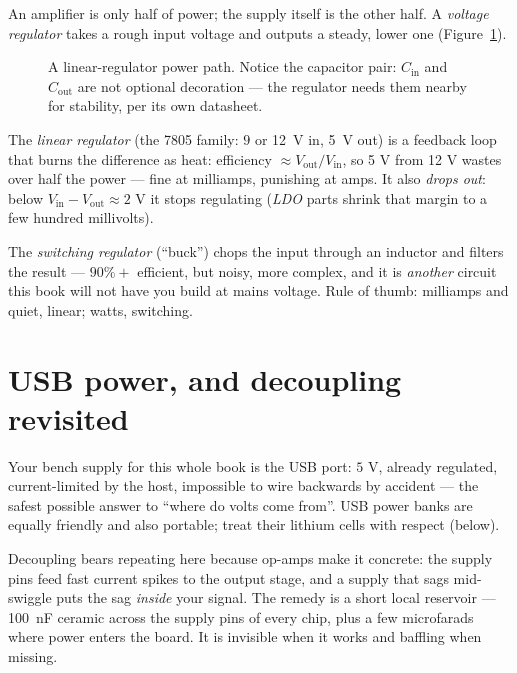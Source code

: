 An amplifier is only half of power; the supply itself is the other half.
A \emph{voltage regulator} takes a rough input
voltage and outputs a steady, lower one (Figure~\ref{fig:reg}).

\begin{figure}[htbp]
\centering

\caption{A linear-regulator power path. Notice the capacitor pair:
$C_{\mathrm{in}}$ and $C_{\mathrm{out}}$ are not optional decoration —
the regulator needs them nearby for stability, per its own datasheet.}
\label{fig:reg}
\end{figure}

The \emph{linear regulator} (the 7805 family: $9$ or \qty{12}{\volt} in,
\qty{5}{\volt} out) is a feedback loop that burns the difference as
heat: efficiency $\approx V_{\mathrm{out}}/V_{\mathrm{in}}$, so 5 V from
12 V wastes over half the power — fine at milliamps, punishing at amps.
It also \emph{drops out}: below
$V_{\mathrm{in}} - V_{\mathrm{out}} \approx 2$ V it stops regulating
(\emph{LDO} parts shrink that margin to a few hundred millivolts).

The \emph{switching regulator} (``buck'') chops
the input through an inductor and filters the result — $90\%+$ efficient,
but noisy, more complex, and it is \emph{another} circuit this book will
not have you build at mains voltage. Rule of thumb: milliamps and quiet,
linear; watts, switching.

\section{USB power, and decoupling revisited}
\label{sec:usb}

Your bench supply for this whole book is the USB port: $5$ V, already
regulated, current-limited by the host, impossible to wire backwards by
accident — the safest possible answer to ``where do volts come from''.
USB power banks are equally friendly and also portable; treat their
lithium cells with respect (below).

Decoupling bears repeating here because op-amps make it
concrete: the supply pins feed fast current spikes to the output stage,
and a supply that sags mid-swiggle puts the sag \emph{inside} your signal.
The remedy is a short local reservoir — \qty{100}{\nano\farad} ceramic
across the supply pins of every chip, plus a few microfarads where power
enters the board. It is invisible when it works and baffling when
missing.

